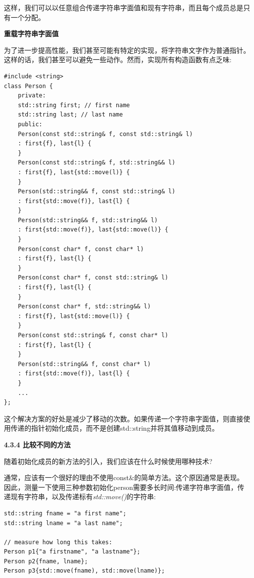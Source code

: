 这样，我们可以以任意组合传递字符串字面值和现有字符串，而且每个成员总是只有一个分配。\par

\hspace*{\fill} \par %
\textbf{重载字符串字面值}

为了进一步提高性能，我们甚至可能有特定的实现，将字符串文字作为普通指针。这样的话，我们甚至可以避免一些动作。然而，实现所有构造函数有点乏味:\par

{\color{red}{basics/initall.hpp}}

\begin{lstlisting}[caption={}]
#include <string>
class Person {
	private:
	std::string first; // first name
	std::string last; // last name
	public:
	Person(const std::string& f, const std::string& l)
	: first{f}, last{l} {
	}
	Person(const std::string& f, std::string&& l)
	: first{f}, last{std::move(l)} {
	}
	Person(std::string&& f, const std::string& l)
	: first{std::move(f)}, last{l} {
	}
	Person(std::string&& f, std::string&& l)
	: first{std::move(f)}, last{std::move(l)} {
	}
	Person(const char* f, const char* l)
	: first{f}, last{l} {
	}
	Person(const char* f, const std::string& l)
	: first{f}, last{l} {
	}
	Person(const char* f, std::string&& l)
	: first{f}, last{std::move(l)} {
	}
	Person(const std::string& f, const char* l)
	: first{f}, last{l} {
	}
	Person(std::string&& f, const char* l)
	: first{std::move(f)}, last{l} {
	}
	...
};
\end{lstlisting}

这个解决方案的好处是减少了移动的次数。如果传递一个字符串字面值，则直接使用传递的指针初始化成员，而不是创建std::string并将其值移动到成员。\par

\hspace*{\fill} \par %
\textbf{4.3.4 比较不同的方法}

随着初始化成员的新方法的引入，我们应该在什么时候使用哪种技术?\par

通常，应该有一个很好的理由不使用const\&的简单方法。这个原因通常是表现。因此，测量一下使用三种参数初始化person需要多长时间:传递字符串字面值，传递现有字符串，以及传递标有\textit{std::move()}的字符串:\par

\begin{lstlisting}[caption={}]
std::string fname = "a first name";
std::string lname = "a last name";

// measure how long this takes:
Person p1{"a firstname", "a lastname"};
Person p2{fname, lname};
Person p3{std::move(fname), std::move(lname)};
\end{lstlisting}

